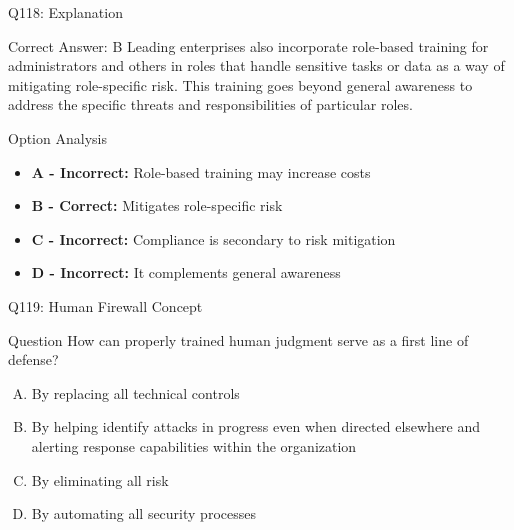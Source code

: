 \documentclass{beamer}
\begin{document}
	\begin{frame}{Q118: Explanation}
		\begin{block}{Correct Answer: B}
			Leading enterprises also incorporate role-based training for administrators and others in roles that handle sensitive tasks or data as a way of mitigating role-specific risk. This training goes beyond general awareness to address the specific threats and responsibilities of particular roles.
		\end{block}
		\begin{block}{Option Analysis}
			\begin{itemize}
				\item \textbf{A - Incorrect:} Role-based training may increase costs
				\item \textbf{B - Correct:} Mitigates role-specific risk
				\item \textbf{C - Incorrect:} Compliance is secondary to risk mitigation
				\item \textbf{D - Incorrect:} It complements general awareness
			\end{itemize}
		\end{block}
	\end{frame}
	
	\begin{frame}{Q119: Human Firewall Concept}
		\begin{block}{Question}
			How can properly trained human judgment serve as a first line of defense?
		\end{block}
		\begin{enumerate}[(A)]
			\item By replacing all technical controls
			\item By helping identify attacks in progress even when directed elsewhere and alerting response capabilities within the organization
			\item By eliminating all risk
			\item By automating all security processes
		\end{enumerate}
	\end{frame}
	
\end{document}
